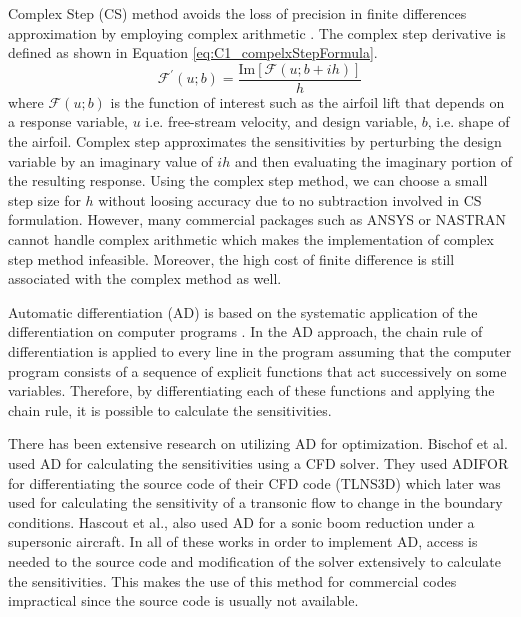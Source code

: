 Complex Step (CS) method avoids the loss of precision in finite differences approximation by employing complex arithmetic \cite{martins2003complex}. The complex step derivative is defined as shown in Equation \eqref{eq:C1_compelxStepFormula}.
%
\begin{equation}\label{eq:C1_compelxStepFormula}
	\mathcal{F}^\prime\left(u; b\right) = \frac{\text{Im}\left[ \mathcal{F}\left(u; b + ih\right) \right]}{h}
\end{equation}
%
where $\mathcal{F}\left(u; b\right)$ is the function of interest such as the airfoil lift that depends on a response variable, $u$ i.e. free-stream velocity, and design variable, $b$, i.e. shape of the airfoil. Complex step approximates the sensitivities by perturbing the design variable by an imaginary value of $ih$ and then evaluating the imaginary portion of the resulting response. Using the complex step method, we can choose a small step size for $h$ without loosing accuracy due to no subtraction involved in CS formulation. However, many commercial packages such as ANSYS or NASTRAN cannot handle complex arithmetic which makes the implementation of complex step method infeasible. Moreover, the high cost of finite difference is still associated with the complex method as well.

Automatic differentiation (AD) is based on the systematic application of the differentiation on computer programs \cite{naumann2012art}. In the AD approach, the chain rule of differentiation is applied to every line in the program assuming that the computer program consists of a sequence of explicit functions that act successively on some variables. Therefore, by differentiating each of these functions and applying the chain rule, it is possible to calculate the sensitivities. 

There has been extensive research on utilizing AD for optimization. Bischof et al. used AD for calculating the sensitivities using a CFD solver. They used ADIFOR for differentiating the source code of their CFD code (TLNS3D) which later was used for calculating the sensitivity of a transonic flow to change in the boundary conditions. Hascout et al., also used AD for a sonic boom reduction under a supersonic aircraft. In all of these works in order to implement AD, access is needed to the source code and modification of the solver extensively to calculate the sensitivities. This makes the use of this method for commercial codes impractical since the source code is usually not available.

